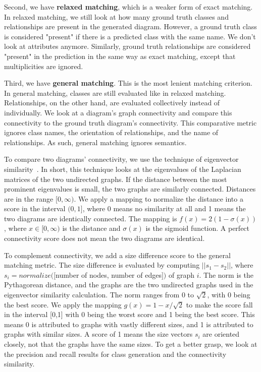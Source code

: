 \documentclass[sigconf]{acmart}
\begin{document}
Second, we have \textbf{relaxed matching}, which is a weaker form of exact matching. In relaxed matching, we still look at how many ground truth classes and relationships are present in the generated diagram. However, a ground truth class is considered "present" if there is a predicted class with the same name. We don't look at attributes anymore. Similarly, ground truth relationships are considered "present" in the prediction in the same way as exact matching, except that multiplicities are ignored.

Third, we have \textbf{general matching}. This is the most lenient matching criterion. In general matching, classes are still evaluated like in relaxed matching. Relationships, on the other hand, are evaluated collectively instead of individually. We look at a diagram's graph connectivity and compare this connectivity to the ground truth diagram's connectivity. This comparative metric ignores class names, the orientation of relationships, and the name of relationships. As such, general matching ignores semantics.

To compare two diagrams' connectivity, we use the technique of eigenvector similarity~\cite{eigen_energy}. In short, this technique looks at the eigenvalues of the Laplacian matrices of the two undirected graphs. If the distance between the most prominent eigenvalues is small, the two graphs are similarly connected. Distances are in the range $[0, \infty)$. We apply a mapping to normalize the distance into a score in the interval $(0,1]$, where 0 means no similarity at all and 1 means the two diagrams are identically connected. The mapping is $f(x) = 2(1-\sigma(x))$, where $x \in [0, \infty)$ is the distance and $\sigma(x)$ is the sigmoid function. A perfect connectivity score does not mean the two diagrams are identical.



To complement connectivity, we add a size difference score to the general matching metric. The size difference is evaluated by computing $||s_1 - s_2||$, where $s_i = normalize([$number of nodes, number of edges$])$ of graph $i$. The norm is the Pythagorean distance, and the graphs are the two undirected graphs used in the eigenvector similarity calculation. The norm ranges from 0 to $\sqrt{2}$, with 0 being the best score. We apply the mapping $g(x) = 1 - x/\sqrt{2}$ to make the score fall in the interval [0,1] with 0 being the worst score and 1 being the best score. This means 0 is attributed to graphs with vastly different sizes, and 1 is attributed to graphs with similar sizes. A score of 1 means the size vectors $s_i$ are oriented closely, not that the graphs have the same sizes. To get a better grasp, we look at the precision and recall results for class generation and the connectivity similarity.
\end{document}
